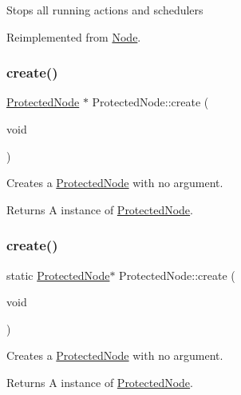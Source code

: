 Stops all running actions and schedulers 

Reimplemented from \hyperlink{classNode_aa2de84c6cdeec9cd647d236c30ee0567}{Node}.

\mbox{\label{classProtectedNode_a9eaee8bebe7898590b919e3065413da9}} 
\subsubsection{\texorpdfstring{create()}{create()}\hspace{0.1cm}{\footnotesize\ttfamily [1/2]}}
{\footnotesize\ttfamily \hyperlink{classProtectedNode}{Protected\+Node} $\ast$ Protected\+Node\+::create (\begin{DoxyParamCaption}\item[{void}]{ }\end{DoxyParamCaption})\hspace{0.3cm}{\ttfamily [static]}}

Creates a \hyperlink{classProtectedNode}{Protected\+Node} with no argument. \begin{DoxyReturn}{Returns}
A instance of \hyperlink{classProtectedNode}{Protected\+Node}. 
\end{DoxyReturn}
\mbox{\label{classProtectedNode_a7f96a27d935e5849b43d7412a09e9810}} 
\subsubsection{\texorpdfstring{create()}{create()}\hspace{0.1cm}{\footnotesize\ttfamily [2/2]}}
{\footnotesize\ttfamily static \hyperlink{classProtectedNode}{Protected\+Node}$\ast$ Protected\+Node\+::create (\begin{DoxyParamCaption}\item[{void}]{ }\end{DoxyParamCaption})\hspace{0.3cm}{\ttfamily [static]}}

Creates a \hyperlink{classProtectedNode}{Protected\+Node} with no argument. \begin{DoxyReturn}{Returns}
A instance of \hyperlink{classProtectedNode}{Protected\+Node}. 
\end{DoxyReturn}
\mbox{\label{classProtectedNode_a91e0476a6296c1d45d7859acace15d7d}} 
